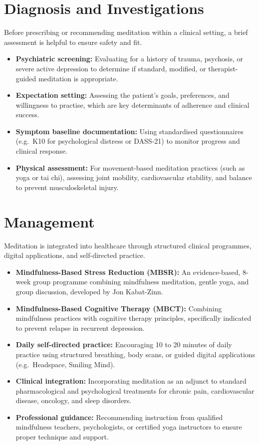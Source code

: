 \section*{Diagnosis and Investigations}
Before prescribing or recommending meditation within a clinical setting, a brief assessment is helpful to ensure safety and fit.
\begin{itemize}
    \item \textbf{Psychiatric screening:} Evaluating for a history of trauma, psychosis, or severe active depression to determine if standard, modified, or therapist-guided meditation is appropriate.
    \item \textbf{Expectation setting:} Assessing the patient's goals, preferences, and willingness to practise, which are key determinants of adherence and clinical success.
    \item \textbf{Symptom baseline documentation:} Using standardised questionnaires (e.g.\ K10 for psychological distress or DASS-21) to monitor progress and clinical response.
    \item \textbf{Physical assessment:} For movement-based meditation practices (such as yoga or tai chi), assessing joint mobility, cardiovascular stability, and balance to prevent musculoskeletal injury.
\end{itemize}

\section*{Management}
Meditation is integrated into healthcare through structured clinical programmes, digital applications, and self-directed practice.
\begin{itemize}
    \item \textbf{Mindfulness-Based Stress Reduction (MBSR):} An evidence-based, 8-week group programme combining mindfulness meditation, gentle yoga, and group discussion, developed by Jon Kabat-Zinn.
    \item \textbf{Mindfulness-Based Cognitive Therapy (MBCT):} Combining mindfulness practices with cognitive therapy principles, specifically indicated to prevent relapse in recurrent depression.
    \item \textbf{Daily self-directed practice:} Encouraging 10 to 20 minutes of daily practice using structured breathing, body scans, or guided digital applications (e.g.\ Headspace, Smiling Mind).
    \item \textbf{Clinical integration:} Incorporating meditation as an adjunct to standard pharmacological and psychological treatments for chronic pain, cardiovascular disease, oncology, and sleep disorders.
    \item \textbf{Professional guidance:} Recommending instruction from qualified mindfulness teachers, psychologists, or certified yoga instructors to ensure proper technique and support.
\end{itemize}

